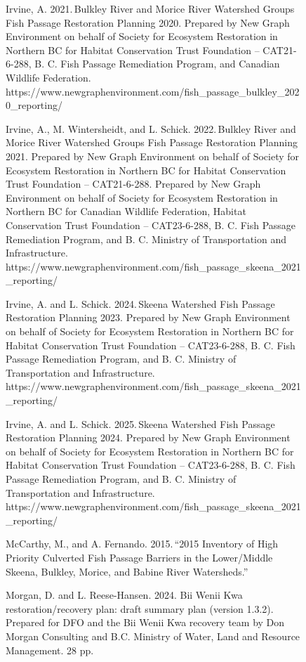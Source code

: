 \documentclass[
  letterpaper,
  DIV=11,
  numbers=noendperiod]{scrreprt}
\begin{document}
\begin{figure}
{

Irvine, A. 2021.\,Bulkley River and Morice River Watershed Groups Fish
Passage Restoration Planning 2020. Prepared by New Graph Environment on
behalf of Society for Ecosystem Restoration in Northern BC for Habitat
Conservation Trust Foundation -- CAT21-6-288, B. C. Fish Passage
Remediation Program, and Canadian Wildlife Federation.
https://www.newgraphenvironment.com/fish\_passage\_bulkley\_2020\_reporting/

Irvine, A., M. Wintersheidt, and L. Schick. 2022.\,Bulkley River and
Morice River Watershed Groups Fish Passage Restoration Planning 2021.
Prepared by New Graph Environment on behalf of Society for Ecosystem
Restoration in Northern BC for Habitat Conservation Trust Foundation --
CAT21-6-288. Prepared by New Graph Environment on behalf of Society for
Ecosystem Restoration in Northern BC for Canadian Wildlife Federation,
Habitat Conservation Trust Foundation -- CAT23-6-288, B. C. Fish Passage
Remediation Program, and B. C. Ministry of Transportation and
Infrastructure.
https://www.newgraphenvironment.com/fish\_passage\_skeena\_2021\_reporting/

Irvine, A. and L. Schick. 2024.\,Skeena Watershed Fish Passage
Restoration Planning 2023. Prepared by New Graph Environment on behalf
of Society for Ecosystem Restoration in Northern BC for Habitat
Conservation Trust Foundation -- CAT23-6-288, B. C. Fish Passage
Remediation Program, and B. C. Ministry of Transportation and
Infrastructure.
https://www.newgraphenvironment.com/fish\_passage\_skeena\_2021\_reporting/

Irvine, A. and L. Schick. 2025.\,Skeena Watershed Fish Passage
Restoration Planning 2024. Prepared by New Graph Environment on behalf
of Society for Ecosystem Restoration in Northern BC for Habitat
Conservation Trust Foundation -- CAT23-6-288, B. C. Fish Passage
Remediation Program, and B. C. Ministry of Transportation and
Infrastructure.
https://www.newgraphenvironment.com/fish\_passage\_skeena\_2021\_reporting/

McCarthy, M., and A. Fernando. 2015.\,``2015 Inventory of High Priority
Culverted Fish Passage Barriers in the Lower/Middle Skeena, Bulkley,
Morice, and Babine River Watersheds.''

Morgan, D. and L. Reese-Hansen. 2024. Bii Wenii Kwa restoration/recovery
plan: draft summary plan (version 1.3.2). Prepared for DFO and the Bii
Wenii Kwa recovery team by Don Morgan Consulting and B.C. Ministry of
Water, Land and Resource Management. 28 pp.~

}
\end{figure}
\end{document}
